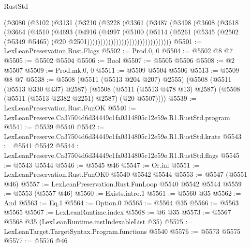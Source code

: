 \begin{lexlean}{RustStd}
\begin{coremodule}
                          (@3080
                            (@3102
                              (@3131
                                (@3210
                                  (@3228
                                    (@3361
                                      (@3487
                                        (@3498
                                          (@3608
                                            (@3618
                                              (@3664
                                                (@4510
                                                  (@4693
                                                    (@4916
                                                      (@4997
                                                        (@5100
                                                          (@5114
                                                            (@5261
                                                              (@5345
                                                                (@2502
                                                                  (@5349 @5465)
                                                                  (@20
                                                                    @2501))))))))))))))))))))))))))))))))
@5501 := LexLeanPreservation.Rust.Flags
@5502 := Prod.{0, 0}
@5504 := @5502 @8 @7
@5505 := @5502 @5504
@5506 := Bool
@5507 := @5505 @5506
@5508 := @2 @5507
@5509 := Prod.mk.{0, 0}
@5511 := @5509 @5504 @5506
@5513 := @5509 @8 @7
@5538 := @5508
    (@5511 (@5513 @204 @207) @2555)
    (@5508
      (@5511 (@5513 @330 @437) @2587)
      (@5508 (@5511 (@5513 @478 @13) @2587) (@5508 (@5511 (@5513 @2382 @2251) @2587) (@20 @5507))))
@5539 := LexLeanPreservation.Rust.FunOK
@5540 := LexLeanPreserve.Ca37504d6d34449c1fa0314805c12e59e.R1.RustStd.program
@5541 := @5539 @5540
@5542 := LexLeanPreserve.Ca37504d6d34449c1fa0314805c12e59e.R1.RustStd.krate
@5543 := @5541 @5542
@5544 := LexLeanPreserve.Ca37504d6d34449c1fa0314805c12e59e.R1.RustStd.flags
@5545 := @5543 @5544
@5546 := @5545 @46
@5547 := Or.inl
@5551 := LexLeanPreservation.Rust.FunOK0 @5540 @5542 @5544
@5553 := @5547 (@5551 @46)
@5557 := LexLeanPreservation.Rust.FunLoop @5540 @5542 @5544
@5559 := @5553 (@5557 @46)
@5560 := Exists.intro.{1}
@5561 := @5560 @35
@5562 := And
@5563 := Eq.{1}
@5564 := Option.{0}
@5565 := @5564 @35
@5566 := @5563 @5565
@5567 := LexLeanRuntime.index
@5568 := @6 @35
@5573 := @5567 @5568 @35 (LexLeanRuntime.instIndexableList @35)
@5575 := LexLeanTarget.TargetSyntax.Program.functions @5540
@5576 := @5573 @5575
@5577 := @5576 @46

\end{coremodule}
\end{lexlean}
